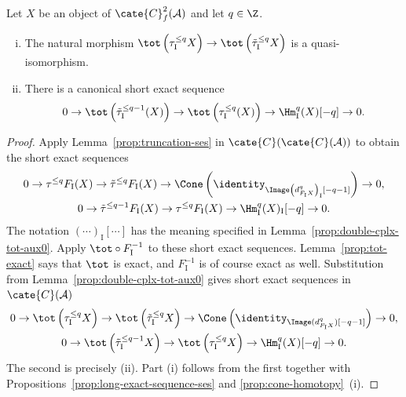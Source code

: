 \begin{lemma}\label{prop:double-cplx-tot-aux}
	Let $X$ be an object of $\cate{C}^2_f(\mathcal{A})$ and let $q\in\Z$.
	\begin{enumerate}[(i)]
		\item The natural morphism
		$\tot\left(\tau_{\mathrm{I}}^{\leq q}X\right)\to
		\tot\left(\tilde{\tau}_{\mathrm{I}}^{\leq q}X\right)$ is a
		quasi-isomorphism.
		\item There is a canonical short exact sequence
		\[ 0 \to \tot\left( \tilde{\tau}_{\mathrm{I}}^{\leq q-1} (X) \right) \to \tot\left( \tau_{\mathrm{I}}^{\leq q}(X) \right) \to \Hm_{\mathrm{I}}^q(X)[-q] \to 0. \]
	\end{enumerate}
\end{lemma}
\begin{proof}
	Apply Lemma~\ref{prop:truncation-ses} in
	$\cate{C}(\cate{C}(\mathcal{A}))$ to obtain the short exact sequences
	\begin{gather*}
		0 \to \tau^{\leq q} F_{\mathrm{I}} (X) \to \tilde{\tau}^{\leq q} F_{\mathrm{I}} (X) \to \Cone\left( \identity_{\Image\left( d^q_{F_{\mathrm{I}} X} \right)_{\mathrm{I}} [-q-1]} \right) \to 0, \\
		0 \to \tilde{\tau}^{\leq q-1} F_{\mathrm{I}}(X) \to \tau^{\leq q} F_{\mathrm{I}}(X) \to \Hm^q_{\mathrm{I}}(X)_{\mathrm{I}}[-q] \to 0.
	\end{gather*}
	The notation $(\cdots)_{\mathrm{I}}[\cdots]$ has the meaning specified in
	Lemma~\ref{prop:double-cplx-tot-aux0}. Apply
	$\tot\circ F_{\mathrm{I}}^{-1}$ to these short exact sequences.
	Lemma~\ref{prop:tot-exact} says that $\tot$ is exact, and
	$F_{\mathrm{I}}^{-1}$ is of course exact as well. Substitution from
	Lemma~\ref{prop:double-cplx-tot-aux0} gives short exact sequences in
	$\cate{C}(\mathcal{A})$
	\begin{gather*}
		0 \to \tot\left(\tau_{\mathrm{I}}^{\leq q} X\right) \to \tot\left( \tilde{\tau}_{\mathrm{I}}^{\leq q} X \right) \to \Cone\left( \identity_{\Image( d_{F_{\mathrm{I}} X}^q )[-q-1]} \right) \to 0, \\
		0 \to \tot\left( \tilde{\tau}_{\mathrm{I}}^{\leq q-1} X \right) \to \tot\left( \tau_{\mathrm{I}}^{\leq q}X \right) \to \Hm_{\mathrm{I}}^q(X)[-q] \to 0.
	\end{gather*}
	The second is precisely (ii). Part (i) follows from the first together with
	Propositions~\ref{prop:long-exact-sequence-ses} and
	\ref{prop:cone-homotopy}~(i).
\end{proof}

